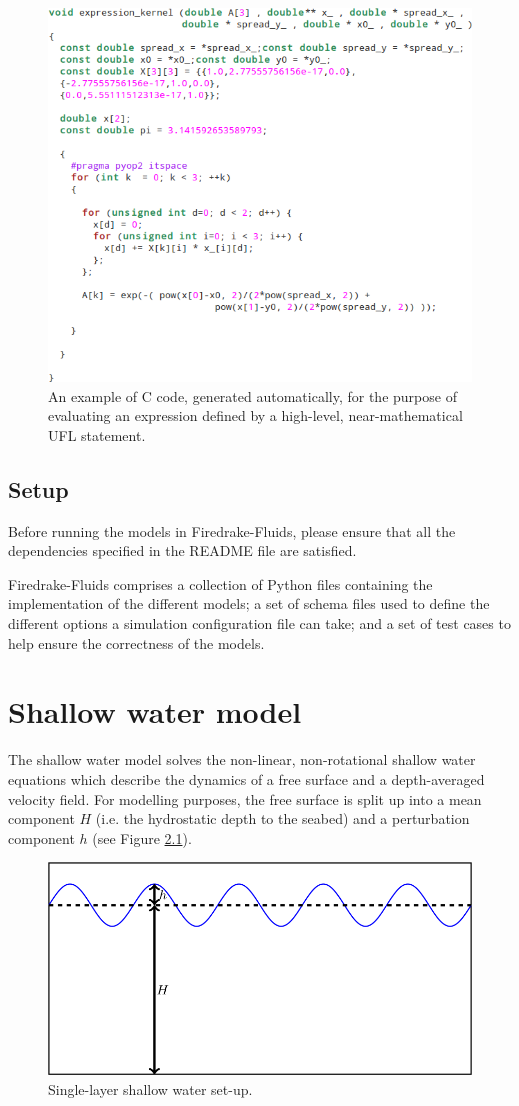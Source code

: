 \documentclass[a4paper,11pt]{report}
\begin{document}
\begin{figure}
   \centering
   \includegraphics[width=0.75\columnwidth]{images/c_kernel.png}
   \caption{An example of C code, generated automatically, for the purpose of evaluating an expression defined by a high-level, near-mathematical UFL statement.}
   \label{fig:c_kernel}
\end{figure}

\section{Setup}
Before running the models in Firedrake-Fluids, please ensure that all the dependencies specified in the README file are satisfied.

Firedrake-Fluids comprises a collection of Python files containing the implementation of the different models; a set of schema files used to define the different options a simulation configuration file can take; and a set of test cases to help ensure the correctness of the models.


\chapter{Shallow water model}
The shallow water model solves the non-linear, non-rotational shallow water equations which describe the dynamics of a free surface and a depth-averaged velocity field. For modelling purposes, the free surface is split up into a mean component $H$ (i.e. the hydrostatic depth to the seabed) and a perturbation component $h$ (see Figure \ref{fig:shallow_water_setup}).

\begin{figure}
   \centering
   \includegraphics[width=0.6\columnwidth]{images/shallow_water_h_H.png}
   \caption{Single-layer shallow water set-up.}
   \label{fig:shallow_water_setup}
\end{figure}
\end{document}
